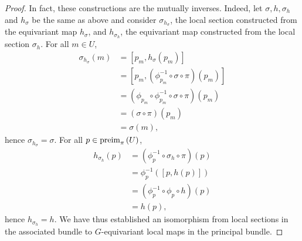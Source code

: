 \begin{proof}
    In fact, these constructions are the mutually inverses. Indeed, let \(\sigma, h, \sigma_h\) and \(h_\sigma\) be the same as above and consider \(\sigma_{h_\sigma}\), the local section constructed from the equivariant map \(h_\sigma\), and \(h_{\sigma_h}\), the equivariant map constructed from the local section \(\sigma_h\). For all \(m \in U\),
    \begin{align*}
        \sigma_{h_\sigma}(m) &= [p_m, h_\sigma(p_m)]\\
                             &= [p_m, (\phi_{p_m}^{-1} \circ \sigma \circ \pi)(p_m)]\\
                             &= (\phi_{p_m} \circ \phi_{p_m}^{-1} \circ \sigma \circ \pi)(p_m)\\
                             &= (\sigma \circ \pi)(p_m)\\
                             &= \sigma(m),
    \end{align*}
    hence \(\sigma_{h_\sigma} = \sigma\). For all \(p \in \operatorname{preim}_{\pi}{\left(U\right)}\),
    \begin{align*}
        h_{\sigma_h}(p) &= (\phi_p^{-1} \circ \sigma_h \circ \pi)(p)\\
                        &= \phi_p^{-1} ([p, h(p)])\\
                        &= (\phi_p^{-1} \circ \phi_p \circ h)(p)\\
                        &= h(p),
    \end{align*}
    hence \(h_{\sigma_h} = h\). We have thus established an isomorphism from local sections in the associated bundle to \(G\)-equivariant local maps in the principal bundle.
\end{proof}
